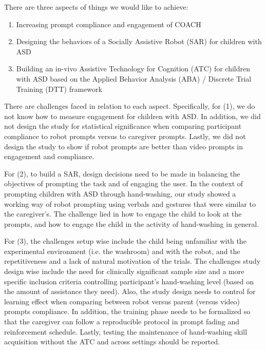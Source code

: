 There are three aspects of things we would like to achieve:
\begin{enumerate}
	\item Increasing prompt compliance and engagement of COACH
	\item Designing the behaviors of a Socially Assistive Robot (SAR) for children with ASD
	\item Building an in-vivo Assistive Technology for Cognition (ATC) for children with ASD based on the Applied Behavior Analysis (ABA) / Discrete Trial Training (DTT) framework
\end{enumerate}

There are challenges faced in relation to each aspect.  Specifically, for (1), we do not know how to measure engagement for children with ASD.  In addition, we did not design the study for statistical significance when comparing participant compliance to robot prompts versus to caregiver prompts.  Lastly, we did not design the study to show if robot prompts are better than video prompts in engagement and compliance.

For (2), to build a SAR, design decisions need to be made in balancing the objectives of prompting the task and of engaging the user.  In the context of prompting children with ASD through hand-washing, our study showed a working way of robot prompting using verbals and gestures that were similar to the caregiver's.  The challenge lied in how to engage the child to look at the prompts, and how to engage the child in the activity of hand-washing in general.

For (3), the challenges setup wise include the child being unfamiliar with the experimental environment (i.e. the washroom) and with the robot, and the repetitiveness and a lack of natural motivation of the trials.  The challenges study design wise include the need for clinically significant sample size and a more specific inclusion criteria controlling participant's hand-washing level (based on the amount of assistance they need).  Also, the study design needs to control for learning effect when comparing between robot versus parent (versus video) prompts compliance.  In addition, the training phase needs to be formalized so that the caregiver can follow a reproducible protocol in prompt fading and reinforcement schedule.  Lastly, testing the maintenance of hand-washing skill acquisition without the ATC and across settings should be reported.

